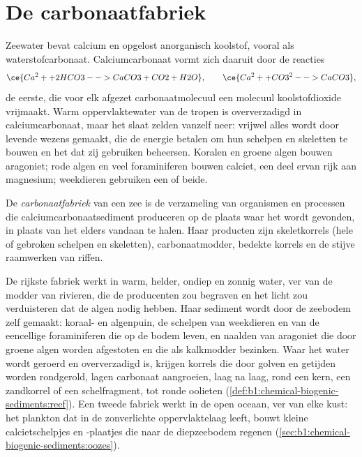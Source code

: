 \section{De carbonaatfabriek}\label{sec:b1:chemical-biogenic-sediments:factory}

Zeewater bevat calcium en opgelost anorganisch koolstof, vooral als waterstofcarbonaat. Calciumcarbonaat vormt zich daaruit door de reacties
\[
\ce{Ca^2+ + 2 HCO3- -> CaCO3 + CO2 + H2O}, \qquad
\ce{Ca^2+ + CO3^2- -> CaCO3},
\]
de eerste, die voor elk afgezet carbonaatmolecuul een molecuul koolstofdioxide vrijmaakt. Warm oppervlaktewater van de tropen is oververzadigd in calciumcarbonaat, maar het slaat zelden vanzelf neer: vrijwel alles wordt door levende wezens gemaakt, die de energie betalen om hun schelpen en skeletten te bouwen en het  dat zij gebruiken beheersen. Koralen en groene algen bouwen aragoniet; rode algen en veel foraminiferen bouwen calciet, een deel ervan rijk aan magnesium; weekdieren gebruiken een of beide.

\begin{definition}[Carbonaatfabriek]\label{def:b1:chemical-biogenic-sediments:factory}
De \emph{carbonaatfabriek} van een zee is de verzameling van organismen en processen die calciumcarbonaatsediment produceren op de plaats waar het wordt gevonden, in plaats van het elders vandaan te halen. Haar producten zijn skeletkorrels (hele of gebroken schelpen en skeletten), carbonaatmodder, bedekte korrels en de stijve raamwerken van riffen.
\end{definition}

De rijkste fabriek werkt in warm, helder, ondiep en zonnig water, ver van de modder van rivieren, die de producenten zou begraven en het licht zou verduisteren dat de algen nodig hebben. Haar sediment wordt door de zeebodem zelf gemaakt: koraal- en algenpuin, de schelpen van weekdieren en van de eencellige foraminiferen die op de bodem leven, en naalden van aragoniet die door groene algen worden afgestoten en die als kalkmodder bezinken. Waar het water wordt geroerd en oververzadigd is, krijgen korrels die door golven en getijden worden rondgerold, lagen carbonaat aangroeien, laag na laag, rond een kern, een zandkorrel of een schelfragment, tot ronde oolieten (\cref{def:b1:chemical-biogenic-sediments:reef}). Een tweede fabriek werkt in de open oceaan, ver van elke kust: het plankton dat in de zonverlichte oppervlaktelaag leeft, bouwt kleine calcietschelpjes en -plaatjes die naar de diepzeebodem regenen (\cref{sec:b1:chemical-biogenic-sediments:oozes}).

